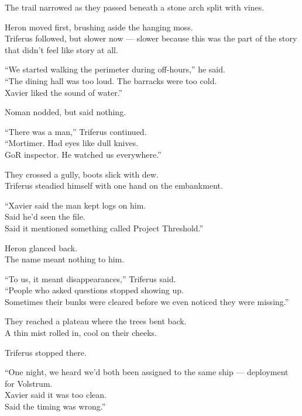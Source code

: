 \documentclass[12pt]{article}
\begin{document}
The trail narrowed as they passed beneath a stone arch split with vines.

Heron moved first, brushing aside the hanging moss.\\
Triferus followed, but slower now — slower because this was the part of the story that didn’t feel like story at all.

\vspace{1em}

“We started walking the perimeter during off-hours,” he said.\\
“The dining hall was too loud. The barracks were too cold.\\
Xavier liked the sound of water.”

Noman nodded, but said nothing.

\vspace{1em}

“There was a man,” Triferus continued.\\
“Mortimer. Had eyes like dull knives.\\
GoR inspector. He watched us everywhere.”

They crossed a gully, boots slick with dew.\\
Triferus steadied himself with one hand on the embankment.

“Xavier said the man kept logs on him.\\
Said he’d seen the file.\\
Said it mentioned something called Project Threshold.”

Heron glanced back.\\
The name meant nothing to him.

“To us, it meant disappearances,” Triferus said.\\
“People who asked questions stopped showing up.\\
Sometimes their bunks were cleared before we even noticed they were missing.”

\vspace{1em}

They reached a plateau where the trees bent back.\\
A thin mist rolled in, cool on their cheeks.

Triferus stopped there.

“One night, we heard we’d both been assigned to the same ship — deployment for Volstrum.\\
Xavier said it was too clean.\\
Said the timing was wrong.”
\end{document}
